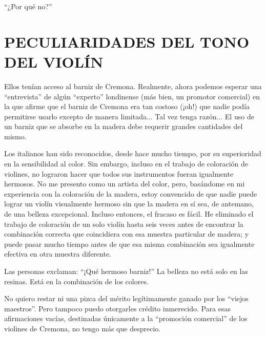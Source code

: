 \documentclass[12pt]{book}
\begin{document}
``¿Por qué no?''

\section*{PECULIARIDADES DEL TONO DEL VIOLÍN}

Ellos tenían acceso al barniz de Cremona.  
Realmente, ahora podemos esperar una ``entrevista'' de algún ``experto'' londinense (más bien, un promotor comercial) en la que afirme que el barniz de Cremona era tan costoso (¡oh!) que nadie podía permitirse usarlo excepto de manera limitada...  
Tal vez tenga razón...  
El uso de un barniz que se absorbe en la madera debe requerir grandes cantidades del mismo.  

Los italianos han sido reconocidos, desde hace mucho tiempo, por su superioridad en la sensibilidad al color. Sin embargo, incluso en el trabajo de coloración de violines, no lograron hacer que todos sus instrumentos fueran igualmente hermosos. No me presento como un artista del color, pero, basándome en mi experiencia con la coloración de la madera, estoy convencido de que nadie puede lograr un violín visualmente hermoso sin que la madera en sí sea, de antemano, de una belleza excepcional. Incluso entonces, el fracaso es fácil.  
He eliminado el trabajo de coloración de un solo violín hasta seis veces antes de encontrar la combinación correcta que coincidiera con esa muestra particular de madera; y puede pasar mucho tiempo antes de que esa misma combinación sea igualmente efectiva en otra muestra diferente.  

Las personas exclaman: ``¡Qué hermoso barniz!''  
La belleza no está solo en las resinas. Está en la combinación de los colores.  

No quiero restar ni una pizca del mérito legítimamente ganado por los ``viejos maestros''. Pero tampoco puedo otorgarles crédito inmerecido. Para esas afirmaciones vacías, destinadas únicamente a la ``promoción comercial'' de los violines de Cremona, no tengo más que desprecio.  
\end{document}
